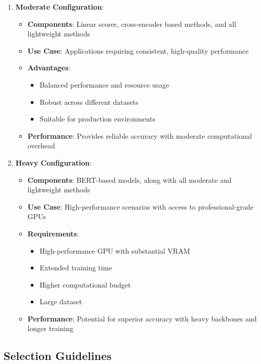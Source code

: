 \begin{enumerate}
    \item \textbf{Moderate Configuration}:
    \begin{itemize}
        \item \textbf{Components}: Linear scorer, cross-encoder based methods, and all lightweight methods
        \item \textbf{Use Case}: Applications requiring consistent, high-quality performance
        \item \textbf{Advantages}:
        \begin{itemize}
            \item Balanced performance and resource usage
            \item Robust across different datasets
            \item Suitable for production environments
        \end{itemize}
        \item \textbf{Performance}: Provides reliable accuracy with moderate computational overhead
    \end{itemize}
    
    \item \textbf{Heavy Configuration}:
    \begin{itemize}
        \item \textbf{Components}: BERT-based models, along with all moderate and lightweight methods
        \item \textbf{Use Case}: High-performance scenarios with access to professional-grade GPUs
        \item \textbf{Requirements}:
        \begin{itemize}
            \item High-performance GPU with substantial VRAM
            \item Extended training time
            \item Higher computational budget
            \item Large dataset
        \end{itemize}
        \item \textbf{Performance}: Potential for superior accuracy with heavy backbones and longer training
    \end{itemize}
\end{enumerate}

\subsection{Selection Guidelines}

